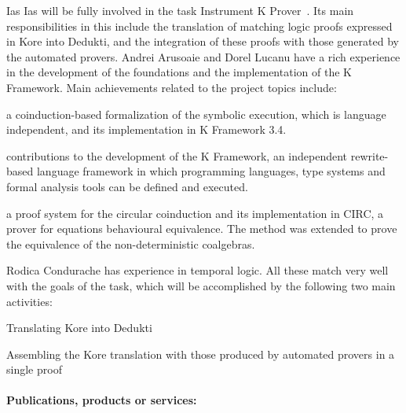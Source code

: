 \begin{sitedescription}{Ias}
Ias will be fully involved in the task Instrument K Prover~. Its main responsibilities in this 
include the translation of matching logic proofs expressed in Kore into Dedukti, and the integration
of these proofs with those generated by the automated provers. Andrei Arusoaie and 
Dorel Lucanu have a rich experience in the development of the foundations and the implementation of the K Framework.
Main achievements related to the project topics include:
\begin{compactitem}
\item  a coinduction-based formalization of the symbolic execution, which is language independent, and its implementation in K Framework 3.4.
\item contributions to the development of the K Framework, an independent rewrite-based language framework in which programming languages, type systems and formal analysis tools can be defined and executed.
\item a proof system for the circular coinduction and its implementation in CIRC, a prover for equations behavioural equivalence. The method was extended to prove the equivalence of the non-deterministic coalgebras.
\end{compactitem}
Rodica Condurache has experience in temporal logic. All these match very well with the goals of the task,  which will be  accomplished by the following two main activities:



\begin{compactitem}
\item Translating Kore into Dedukti
\item Assembling the Kore translation with those produced by automated provers in a single proof
\end{compactitem}

\paragraph*{Publications, products or services:}



\end{sitedescription}
